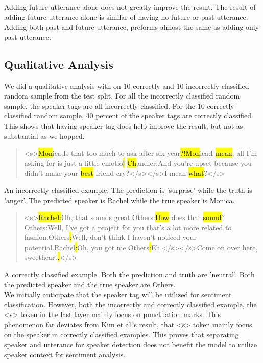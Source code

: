 \documentclass[11pt]{article}
\begin{document}
Adding future utterance alone does not greatly improve the result. The result of adding future utterance alone is similar of having no future or past utterance. Adding both past and future utterance, preforms almost the same as adding only past utterance. 

\subsection{Qualitative Analysis}

We did a qualitative analysis with on 10 correctly and 10 incorrectly classified random sample from the test split. For all the incorrectly classified random sample, the speaker tags are all incorrectly classified. For the 10 correctly classified random sample, 40 percent of the speaker tags are correctly classified. This shows that having speaker tag does help improve the result, but not as substantial as we hopped. 

\begin{quote}

<s>\hl{Mon}ica:Is that too much to ask after six year\hl{?!}\hl{Mon}ica:I \hl{mean}, all I’m asking for is just a little emotio\hl{!} \hl{Ch}andler:And you’re upset because you didn’t make your \hl{best} friend cry?</s></s>I mean \hl{what}?</s>

\end{quote}

An incorrectly classified example. The prediction is 'surprise' while the truth is 'anger'. The predicted speaker is Rachel while the true speaker is Monica.

\begin{quote}

<s>\hl{Rachel}\hl{:}Oh, that sounds great.Others:\hl{How} does that \hl{sound}?Others:Well, I’ve got a project for you that’s a lot more related to fashion.Others\hl{:}Well, don’t think I haven’t noticed your potential.Rachel\hl{:}Oh, you got me.Others\hl{:}Eh.</s></s>Come on over here, sweetheart\hl{.}</s>

\end{quote}

A correctly classified example. Both the prediction and truth are 'neutral'. Both the predicted speaker and the true speaker are Others. \\

We initially anticipate that the speaker tag will be utilized for sentiment classification. However, both the incorrectly and correctly classified example, the <s> token in the last layer mainly focus on punctuation marks. This phenomenon far deviates from Kim et al.'s result, that <s> token mainly focus on the speaker in correctly classified examples. This proves that separating speaker and utterance for speaker detection does not benefit the model to utilize speaker context for sentiment analysis.
\end{document}
